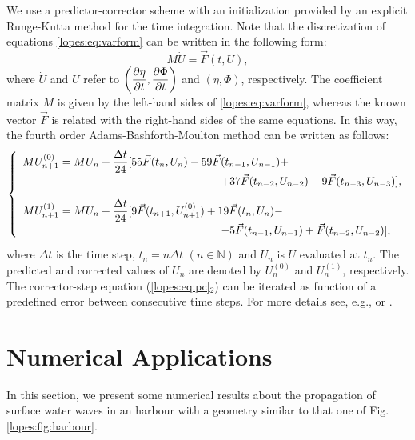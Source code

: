 We use
a predictor-corrector   scheme with an initialization
provided by an explicit Runge-Kutta method for the
time integration.
Note that the discretization of
equations \eqref{lopes:eq:varform} can be written in the following form:
\begin{equation}
M\dot U={\vec{F}}(t,U),
\end{equation}
where \(\dot U\) and \(U\) refer
to \(\displaystyle \left(\frac{\partial \eta}{\partial t},\frac{\partial \Phi}{\partial t}\right)\)
and  \((\eta,\Phi)\), respectively. 
The  coefficient matrix \(M\) is given by the left-hand
sides of \eqref{lopes:eq:varform}, whereas
the  known vector \(\vec{F}\) is  related
with the right-hand sides of the same equations.  
In this way,  the fourth order  Adams-Bashforth-Moulton method 
can be written as follows:  
\begin{equation}\label{lopes:eq:pc}
\renewcommand{\arraystretch}{1.3}
\left\{
\begin{array}{l}
\displaystyle MU^{(0)}_{n+1}=MU_n+\frac{\Delta
t}{24}[55{\vec{F}}(t_n,U_n)-59{\vec{F}}(t_{n-1},U_{n-1})+\\
\hspace{2.5in}+37{\vec{F}}(t_{n-2},U_{n-2})-9{\vec{F}}(t_{n-3},U_{n-3})],
\vspace{0.3cm}\\ 
\displaystyle MU^{(1)}_{n+1}=MU_n+\frac{\Delta
t}{24}[9{\vec{F}}(t_{n+1},U^{(0)}_{n+1})+19{\vec{F}}(t_n,U_n)-\\
\hspace{2.5in}-5{\vec{F}}(t_{n-1},U_{n-1})+{\vec{F}}(t_{n-2},U_{n-2})],
\end{array}
\right.
\end{equation}
where \(\Delta t\) is the time step, \(t_n=n\Delta
  t\) \((n\in \mathbb{N})\) and \(U_n\) is \(U\) 
  evaluated at \(t_n\).
  The predicted and
corrected values of \(U_n\) are denoted by \(U_n^{(0)}\) and \(U_n^{(1)}\),  respectively.  
The corrector-step equation (\eqref{lopes:eq:pc}\(_{2}\)) can
be iterated as  function of a predefined error
between consecutive time steps. For more details see, e.g.,  \cite{HairerWanner1991a}
or \cite{Lambert1991}.



\section{Numerical Applications}
In this section, 
we present some numerical results about the propagation
 of surface water waves in an harbour with a geometry
similar to that one of  Fig. \ref{lopes:fig:harbour}.

